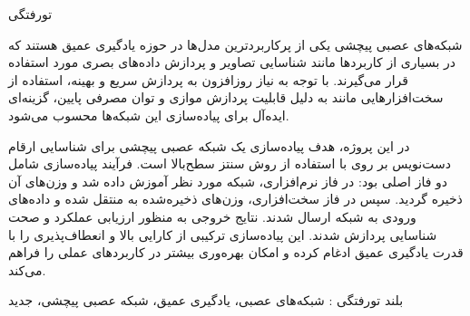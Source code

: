 

‌تورفتگی



شبکه‌های عصبی پیچشی یکی از پرکاربردترین مدل‌ها در حوزه یادگیری عمیق هستند که در بسیاری از کاربردها مانند شناسایی تصاویر و پردازش داده‌های بصری مورد استفاده قرار می‌گیرند. با توجه به نیاز روزافزون به پردازش سریع و بهینه، استفاده از سخت‌افزارهایی مانند  به دلیل قابلیت پردازش موازی و توان مصرفی پایین، گزینه‌ای ایده‌آل برای پیاده‌سازی این شبکه‌ها محسوب می‌شود.

در این پروژه، هدف پیاده‌سازی یک شبکه عصبی پیچشی برای شناسایی ارقام دست‌نویس بر روی  با استفاده از روش سنتز سطح‌بالا است. فرآیند پیاده‌سازی شامل دو فاز اصلی بود: در فاز نرم‌افزاری، شبکه مورد نظر آموزش داده شد و وزن‌های آن ذخیره گردید. سپس در فاز سخت‌افزاری، وزن‌های ذخیره‌شده به  منتقل شده و داده‌های ورودی به شبکه ارسال شدند. نتایج خروجی به منظور ارزیابی عملکرد و صحت شناسایی پردازش شدند. این پیاده‌سازی ترکیبی از کارایی بالا و انعطاف‌پذیری  را با قدرت یادگیری عمیق ادغام کرده و امکان بهره‌وری بیشتر در کاربردهای عملی را فراهم می‌کند.



‌بلند
‌تورفتگی : 
شبکه‌های عصبی، یادگیری عمیق، شبکه عصبی پیچشی، 
‌جدید
